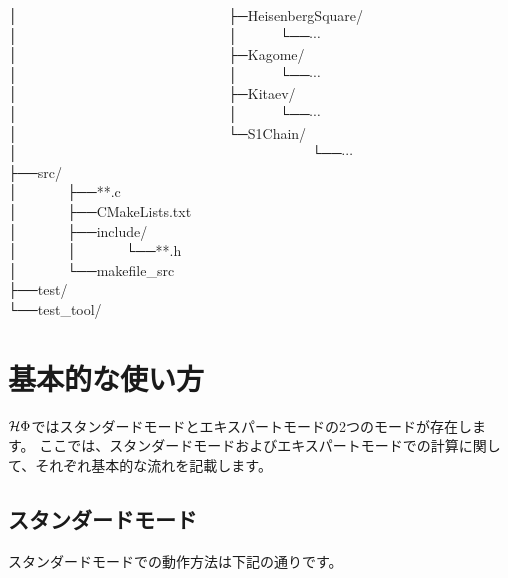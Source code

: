│~~~~~~~~~~~~~~~~~~~~~~~~~~~~~~├─HeisenbergSquare/\\
│~~~~~~~~~~~~~~~~~~~~~~~~~~~~~~│~~~~~~└──$\cdots$\\
│~~~~~~~~~~~~~~~~~~~~~~~~~~~~~~├─Kagome/\\
│~~~~~~~~~~~~~~~~~~~~~~~~~~~~~~│~~~~~~└──$\cdots$\\
│~~~~~~~~~~~~~~~~~~~~~~~~~~~~~~├─Kitaev/\\
│~~~~~~~~~~~~~~~~~~~~~~~~~~~~~~│~~~~~~└──$\cdots$\\
│~~~~~~~~~~~~~~~~~~~~~~~~~~~~~~└─S1Chain/\\
│~~~~~~~~~~~~~~~~~~~~~~~~~~~~~~~~~~~~~~~~~~└──$\cdots$\\
├──src/\\
│~~~~~~~├──**.c\\
│~~~~~~~├──CMakeLists.txt\\
│~~~~~~~├──include/\\
│~~~~~~~│~~~~~~~└──**.h\\
│~~~~~~~└──makefile\_src\\
├──test/\\
└──test\_tool/\\

\newpage
\section{基本的な使い方}
$\mathcal{H} \Phi$ではスタンダードモードとエキスパートモードの2つのモードが存在します。
ここでは、スタンダードモードおよびエキスパートモードでの計算に関して、それぞれ基本的な流れを記載します。

\subsection{スタンダードモード}
スタンダードモードでの動作方法は下記の通りです。

